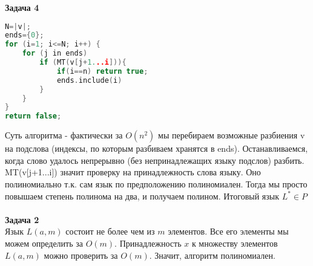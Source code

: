\documentclass[11pt]{article}
\begin{document}
\textbf{Задача 4}
\\
\begin{lstlisting}[language= C++,stepnumber=1,numbersep=5pt ]
N=|v|; 
ends={0}; 
for (i=1; i<=N; i++) {
	for (j in ends)
		if (MT(v[j+1...i])){
			if(i==n) return true;
			ends.include(i)
		}
	}
}
return false;
\end{lstlisting}
Суть алгоритма - фактически за $O(n^2)$ мы перебираем возможные разбиения v на подслова (индексы, по которым разбиваем хранятся в ends). Останавливаемся, когда слово удалось непрерывно (без непринадлежащих языку подслов) разбить. MT(v[j+1...i]) значит проверку на принадлежность слова языку. Оно полиномиально т.к. сам язык по предположению полиномиален.  Тогда мы просто повышаем степень полинома на два, и получаем полином. Итоговый язык $L^* \in P$
\\
\\

\textbf{Задача 2}
\\
Язык $L(a,m)$ состоит не более чем из $m$ элементов. Все его элементы мы можем определить за $O(m)$. Принадлежность $x$ к множеству элементов $L(a,m)$ можно проверить за $O(m)$. Значит, алгоритм полиномиален.
\end{document}
